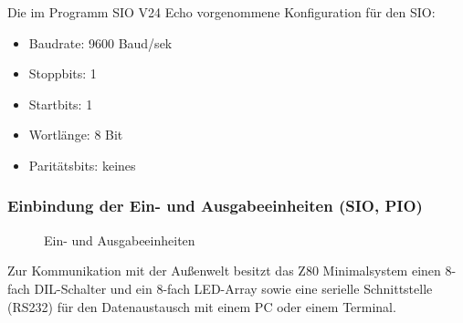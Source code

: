 Die im Programm SIO V24 Echo vorgenommene Konfiguration für den SIO:

\begin{itemize}
    \item Baudrate: 9600 Baud/sek
    \item Stoppbits: 1
    \item Startbits: 1
    \item Wortlänge: 8 Bit
    \item Paritätsbits: keines
\end{itemize}

\subsubsection{Einbindung der Ein- und Ausgabeeinheiten (SIO, PIO)}
\begin{figure}[H]
    \centering
    \qquad
    \qquad
    \qquad
    \caption[Z80 Ein-/Ausgabeeinheiten]{Ein- und Ausgabeeinheiten}
    \label{fig:z80-io}
\end{figure}
Zur Kommunikation mit der Außenwelt besitzt das Z80 Minimalsystem einen 8-fach DIL-Schalter und ein 8-fach LED-Array sowie eine serielle Schnittstelle (RS232) für den Datenaustausch mit einem PC oder einem Terminal.

